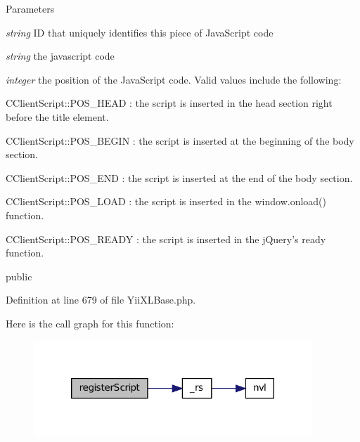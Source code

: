 \begin{DoxyParams}{Parameters}
\item[{\em string}]ID that uniquely identifies this piece of JavaScript code \item[{\em string}]the javascript code \item[{\em integer}]the position of the JavaScript code. Valid values include the following: 
\begin{DoxyItemize}
\item CClientScript::POS\_\-HEAD : the script is inserted in the head section right before the title element. 
\item CClientScript::POS\_\-BEGIN : the script is inserted at the beginning of the body section. 
\item CClientScript::POS\_\-END : the script is inserted at the end of the body section. 
\item CClientScript::POS\_\-LOAD : the script is inserted in the window.onload() function. 
\item CClientScript::POS\_\-READY : the script is inserted in the jQuery's ready function. 
\end{DoxyItemize}public \end{DoxyParams}


Definition at line 679 of file YiiXLBase.php.








Here is the call graph for this function:\nopagebreak
\begin{figure}[H]
\begin{center}
\leavevmode
\includegraphics[width=296pt]{classYiiXLBase_a9fcce4225d8f12cbd7edcf81b27b8f42_cgraph}
\end{center}
\end{figure}


